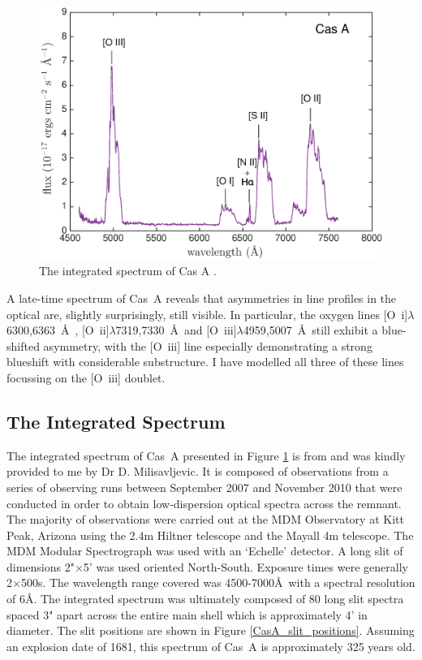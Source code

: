 \begin{figure}
\centering
\includegraphics[clip=true,scale=0.6, trim=30 0 50 20]{chapters/chapter6/figs/CasA/spectrum}
\caption{The integrated spectrum of Cas A \citep{Milisavljevic2013}.}
\label{CasA_spectrum}
\end{figure}

A late-time spectrum of Cas~A reveals that asymmetries in line profiles in the optical are, slightly surprisingly, still visible.  In particular, the oxygen lines [O~{\sc i}]$\lambda$6300,6363~\AA\ , [O~{\sc ii}]$\lambda$7319,7330~\AA\  and [O~{\sc iii}]$\lambda$4959,5007~\AA\  still exhibit a blue-shifted asymmetry, with the [O~{\sc iii}] line especially demonstrating a strong blueshift with considerable substructure.  I have modelled all three of these lines focussing on the [O~{\sc iii}] doublet.

\subsection{The Integrated Spectrum}

The integrated spectrum of Cas~A presented in Figure \ref{CasA_spectrum} is from \citet{Milisavljevic2013} and was kindly provided to me by Dr D. Milisavljevic.  It is composed of observations from a series of observing runs between September 2007 and November 2010 that were conducted in order to obtain low-dispersion optical spectra across the remnant.  The majority of observations were carried out at the MDM Observatory at Kitt Peak, Arizona using the 2.4m Hiltner telescope and the Mayall 4m telescope.  The MDM Modular Spectrograph was used with an `Echelle' detector.  A long slit of dimensions 2"$\times$5' was used oriented North-South.  Exposure times were generally 2$\times$500s.  The wavelength range covered was 4500-7000\AA\  with a spectral resolution of 6\AA.  
The integrated spectrum was ultimately composed of 80 long slit spectra spaced 3" apart across the entire main shell which is approximately 4' in diameter.  The slit positions are shown in Figure \ref{CasA_slit_positions}.  Assuming an explosion date of 1681, this spectrum of Cas~A is approximately 325 years old.

